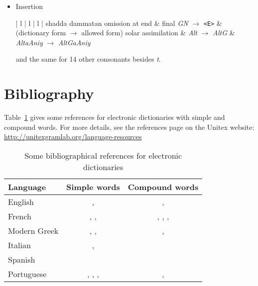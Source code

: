 \begin{itemize}
\item Insertion
    \begin{longtable}{| l | l | l | }\hline
      {\small shadda dammatan omission at end}	& final \textit{GN} $\rightarrow$ \verb$<E>$ & {\small (dictionary form $\rightarrow$ allowed form)} \kill
      {\small solar assimilation}	& \textit{Alt} $\rightarrow$ \textit{AltG} & \textit{AltaAniy} $\rightarrow$ \textit{AltGaAniy} \\\hline
    \end{longtable}
 \vspace{-3mm}    and the same for 14 other consonants besides \textit{t}.
\end{itemize}




\section{Bibliography}


Table~\ref{ref-dicos} gives some references for electronic dictionaries with simple and 
compound words. For more details, see the references page on the Unitex website: \\
\url{http://unitexgramlab.org/language-resources}

\begin{table}[!ht]
\begin{center}
\begin{tabular}{|l|c|c|}
\hline
\textbf{Language} & \textbf{Simple words} & \textbf{Compound words} \\
\hline
English & \cite{klarsfeld}, \cite{monceaux-1995} & \cite{delac-anglais},
\cite{these-Savary} \\
\hline
French & \cite{formes-ambigues}, \cite{dicos-francais}, \cite{jacques-1995} & \cite{dicos-francais},
\cite{Gross96},
\cite{max-1993},
\cite{syntaxe-de-ladverbe} \\
\hline
Modern Greek & \cite{modern-greek}, \cite{matthieu-anastasia}, \cite{these-tita} & \cite{tita-2002},
\cite{anastasia-2002} \\
\hline
Italian & \cite{delaf-italien}, \cite{delaf-italien-book} & \cite{composes-italien} \\
\hline
Spanish & \cite{blanco-2000} & \cite{blanco-1997} \\
\hline
Portuguese & \cite{eleuterio1995}, \cite{ranchhod1996b}, \cite{ranchhodd1998},
\cite{muniz2005} & \cite{ranchhod1991}, \cite{ranchhodd1998} \\
\hline
\end{tabular}
\caption{Some bibliographical references for electronic dictionaries\label{ref-dicos}}
\end{center}
\end{table}
